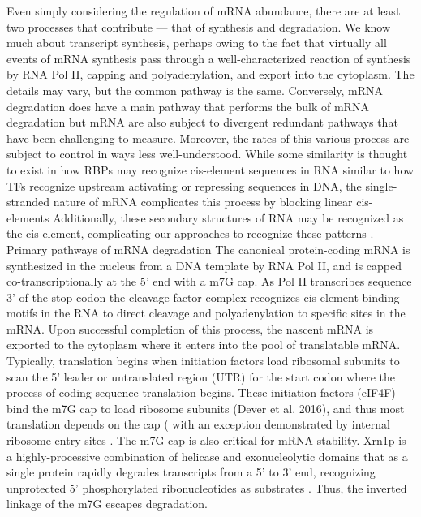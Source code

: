 Even simply considering the regulation of mRNA
abundance, there are at least two processes that contribute --- that
of synthesis and degradation. We know much about transcript synthesis,
perhaps owing to the fact that virtually all events of mRNA synthesis
pass through a well-characterized reaction of synthesis by RNA Pol II,
capping and polyadenylation, and export into the cytoplasm. The
details may vary, but the common pathway is the same. Conversely, mRNA
degradation does have a main pathway that performs the bulk of mRNA
degradation but mRNA are also subject to divergent redundant pathways
that have been challenging to measure. Moreover, the rates of this
various process are subject to control in ways less well-understood.
While some similarity is thought to exist in how RBPs may recognize
cis-element sequences in RNA similar to how TFs recognize upstream
activating or repressing sequences in DNA, the single-stranded
nature of mRNA complicates this process by blocking linear
cis-elements 
\parencite{li2010predicting}
Additionally, these secondary
structures of RNA may be recognized as the cis-element, complicating
our approaches to recognize these patterns
\parencite{goodarzi2012systematic}.
Primary pathways of mRNA degradation The canonical protein-coding mRNA
is synthesized in the nucleus from a DNA template by RNA Pol II, and
is capped co-transcriptionally at the 5’ end with a m7G cap. As Pol II
transcribes sequence 3’ of the stop codon the cleavage factor complex
recognizes cis element binding motifs in the RNA to direct cleavage
and polyadenylation to specific sites in the mRNA. Upon successful
completion of this process, the nascent mRNA is exported to the
cytoplasm where it enters into the pool of translatable mRNA.
Typically, translation begins when initiation factors load ribosomal
subunits to scan the 5’ leader or untranslated region (UTR) for the
start codon where the process of coding sequence translation begins.
These initiation factors (eIF4F) bind the m7G cap to load ribosome
subunits (Dever et al. 2016), and thus most translation depends on the
cap ( with an exception demonstrated by internal ribosome entry sites
\parencite{gilbert2007cap}.
The m7G cap is also critical for mRNA
stability. Xrn1p is a highly-processive combination of helicase and
exonucleolytic domains that as a single protein rapidly degrades
transcripts from a 5’ to 3’ end, recognizing unprotected 5’
phosphorylated ribonucleotides as substrates \parencite{parker2012rna}. Thus, the
inverted linkage of the m7G escapes degradation.  

